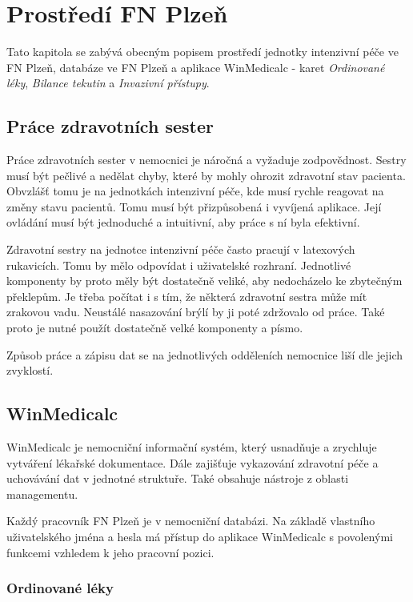 \chapter{Prostředí FN Plzeň}
\label{ch:fn}

Tato kapitola se zabývá obecným popisem prostředí jednotky intenzivní péče ve FN Plzeň, databáze ve FN Plzeň a aplikace WinMedicalc - karet \emph{Ordinované léky}, \emph{Bilance tekutin} a \emph{Invazivní přístupy}.

\section{Práce zdravotních sester}

Práce zdravotních sester v nemocnici je náročná a vyžaduje zodpovědnost. Sestry musí být pečlivé a nedělat chyby, které by mohly ohrozit zdravotní stav pacienta. Obvzlášť tomu je na jednotkách intenzivní péče, kde musí rychle reagovat na změny stavu pacientů. Tomu musí být přizpůsobená i vyvíjená aplikace. Její ovládání musí být jednoduché a intuitivní, aby práce s ní byla efektivní.

Zdravotní sestry na jednotce intenzivní péče často pracují v latexových rukavicích. Tomu by mělo odpovídat i uživatelské rozhraní. Jednotlivé komponenty by proto měly být dostatečně veliké, aby nedocházelo ke zbytečným překlepům. Je třeba počítat i s tím, že některá zdravotní sestra může mít zrakovou vadu. Neustálé nasazování brýlí by ji poté zdržovalo od práce. Také proto je nutné použít dostatečně velké komponenty a písmo.

Způsob práce a zápisu dat se na jednotlivých odděleních nemocnice liší dle jejich zvyklostí.

\section{WinMedicalc}

WinMedicalc je nemocniční informační systém, který usnadňuje a zrychluje vytváření lékařské dokumentace. Dále zajišťuje vykazování zdravotní péče a uchovávání dat v jednotné struktuře. Také obsahuje nástroje z oblasti managementu.

Každý pracovník FN Plzeň je v nemocniční databázi. Na základě vlastního uživatelského jména a hesla má přístup do aplikace WinMedicalc s povolenými funkcemi vzhledem k jeho pracovní pozici.

\subsection{Ordinované léky}

